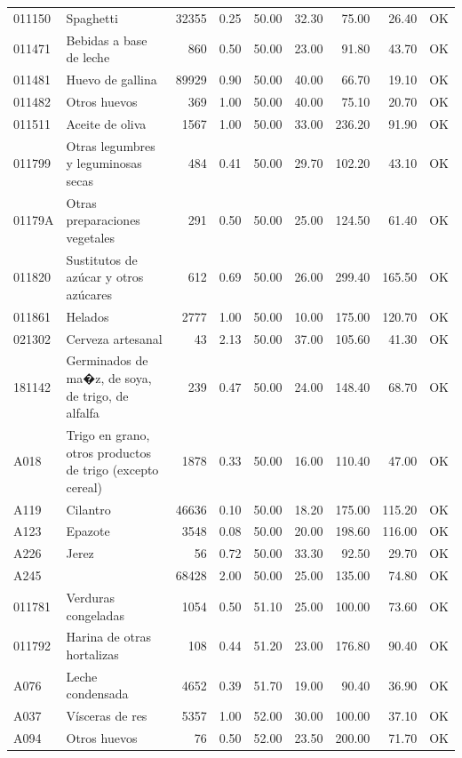 \begin{table}[ht]
\begin{tabular}{llrrrrrrl}
  011150 & Spaghetti & 32355 & 0.25 & 50.00 & 32.30 & 75.00 & 26.40 & OK \\ 
  011471 & Bebidas a base de leche & 860 & 0.50 & 50.00 & 23.00 & 91.80 & 43.70 & OK \\ 
  011481 & Huevo de gallina & 89929 & 0.90 & 50.00 & 40.00 & 66.70 & 19.10 & OK \\ 
  011482 & Otros huevos & 369 & 1.00 & 50.00 & 40.00 & 75.10 & 20.70 & OK \\ 
  011511 & Aceite de oliva & 1567 & 1.00 & 50.00 & 33.00 & 236.20 & 91.90 & OK \\ 
  011799 & Otras legumbres y leguminosas secas & 484 & 0.41 & 50.00 & 29.70 & 102.20 & 43.10 & OK \\ 
  01179A & Otras preparaciones vegetales & 291 & 0.50 & 50.00 & 25.00 & 124.50 & 61.40 & OK \\ 
  011820 & Sustitutos de azúcar y otros azúcares & 612 & 0.69 & 50.00 & 26.00 & 299.40 & 165.50 & OK \\ 
  011861 & Helados & 2777 & 1.00 & 50.00 & 10.00 & 175.00 & 120.70 & OK \\ 
  021302 & Cerveza artesanal &  43 & 2.13 & 50.00 & 37.00 & 105.60 & 41.30 & OK \\ 
  181142 & Germinados de ma�z, de soya, de trigo, de alfalfa & 239 & 0.47 & 50.00 & 24.00 & 148.40 & 68.70 & OK \\ 
  A018 & Trigo en grano, otros productos de trigo (excepto cereal) & 1878 & 0.33 & 50.00 & 16.00 & 110.40 & 47.00 & OK \\ 
  A119 & Cilantro & 46636 & 0.10 & 50.00 & 18.20 & 175.00 & 115.20 & OK \\ 
  A123 & Epazote & 3548 & 0.08 & 50.00 & 20.00 & 198.60 & 116.00 & OK \\ 
  A226 & Jerez &  56 & 0.72 & 50.00 & 33.30 & 92.50 & 29.70 & OK \\ 
  A245 &  & 68428 & 2.00 & 50.00 & 25.00 & 135.00 & 74.80 & OK \\ 
  011781 & Verduras congeladas & 1054 & 0.50 & 51.10 & 25.00 & 100.00 & 73.60 & OK \\ 
  011792 & Harina de otras hortalizas & 108 & 0.44 & 51.20 & 23.00 & 176.80 & 90.40 & OK \\ 
  A076 & Leche condensada & 4652 & 0.39 & 51.70 & 19.00 & 90.40 & 36.90 & OK \\ 
  A037 & Vísceras de res & 5357 & 1.00 & 52.00 & 30.00 & 100.00 & 37.10 & OK \\ 
  A094 & Otros huevos &  76 & 0.50 & 52.00 & 23.50 & 200.00 & 71.70 & OK \\ 

\end{tabular}
\end{table}
